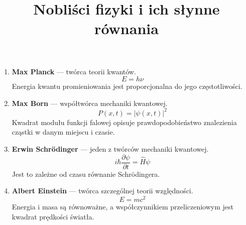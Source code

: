 \documentclass[12pt,a4paper]{article}
\title{Nobliści fizyki i ich słynne równania}
\author{}
\date{}
\begin{document}
\maketitle

\begin{enumerate}
    \item \textbf{Max Planck} --- twórca teorii kwantów.
    \[
        E = h\nu
    \]
    Energia kwantu promieniowania jest proporcjonalna do jego częstotliwości.

    \item \textbf{Max Born} --- współtwórca mechaniki kwantowej.
    \[
        P(x,t) = \lvert\psi(x,t)\rvert^2
    \]
    Kwadrat modułu funkcji falowej opisuje prawdopodobieństwo znalezienia
    cząstki w danym miejscu i czasie.

    \item \textbf{Erwin Schrödinger} --- jeden z twórców mechaniki kwantowej.
    \[
        i\hbar\frac{\partial\psi}{\partial t}
        = \hat{H}\psi
    \]
    Jest to zależne od czasu równanie Schrödingera.

    \item \textbf{Albert Einstein} --- twórca szczególnej teorii względności.
    \[
        E = mc^2
    \]
    Energia i masa są równoważne, a współczynnikiem przeliczeniowym jest
    kwadrat prędkości światła.
\end{enumerate}
\end{document}
